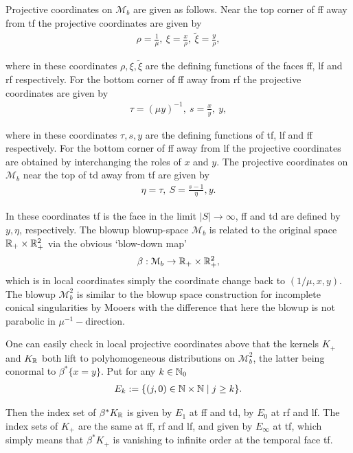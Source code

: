 Projective coordinates on $\mathcal{M}_b$ are given as follows. 
Near the top corner of ff away from tf the projective coordinates are given by
\begin{align}\label{top-coord}
\rho=\frac{1}{\mu}, \  \xi=\frac{x}{\rho}, \ \widetilde{\xi}=\frac{y}{\rho},
\end{align}

where in these coordinates $\rho, \xi, \widetilde{\xi}$ are the defining functions of 
the faces ff, lf and rf respectively. For the bottom corner of ff away from rf the 
projective coordinates are given by
\begin{align}\label{right-coord}
\tau=(\mu y)^{-1}, \ s=\frac{x}{y}, \ y,
\end{align}

where in these coordinates $\tau, s, y$ are the defining functions of tf, lf and ff respectively. 
For the bottom corner of ff away from lf the projective coordinates are obtained by interchanging 
the roles of $x$ and $y$. The projective coordinates on $\mathcal{M}_b$ near the top of td away 
from tf are given by 
\begin{align}\label{d-coord}
\eta=\tau, \ S =\frac{s-1}{\eta}, y.
\end{align}

In these coordinates tf is the face in the limit $|S|\to \infty$, ff and td are defined by 
$y, \eta$, respectively. The blowup blowup-space $\mathcal{M}_b$ is related to the original 
space $\mathbb{R}_+\times \mathbb{R}_+^2$ via the obvious `blow-down map'
\[
\beta: \mathcal{M}_b\to \mathbb{R}_+\times \mathbb{R}_+^2,
\]
which is in local coordinates simply the coordinate change back to $(1/\mu, x,y)$. 
The blowup $\mathscr{M}^2_b$ is similar to the blowup space construction for incomplete
conical singularities by Mooers \cite{Moo:HKA} with the difference that here the 
blowup is not parabolic in $\mu^{-1}-$direction.

One can easily check in local projective coordinates above that the 
kernels $K_+$ and $K_{\mathbb{R}}$ both lift to polyhomogeneous 
distributions on $\mathscr{M}^2_b$, the latter being conormal to $\beta^*\{x=y\}$. 
Put for any $k\in \mathbb{N}_0$ 
\begin{align}
E_k:=\{(j,0)\in \mathbb{N}\times \mathbb{N} \mid j \geq k\}.
\end{align}

Then the index set of $\beta^*K_{\mathbb{R}}$ is given by $E_1$ at ff and td, 
by $E_0$ at rf and lf. The index sets of $K_+$ are the same at ff, rf and lf, 
and given by $E_{\infty}$ at tf, which simply means that 
$\beta^*K_+$ is vanishing to infinite order at the temporal face tf. 

